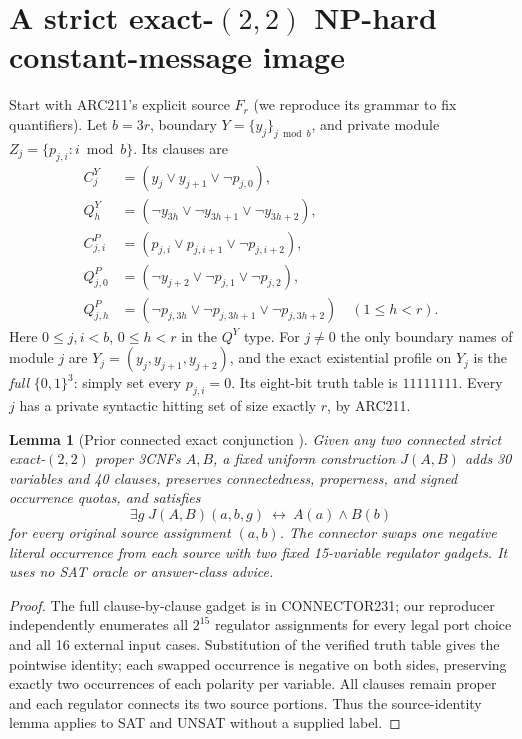 \documentclass[10pt]{article}
\newtheorem{lemma}[theorem]{Lemma}
\begin{document}
\section{A strict exact-$(2,2)$ NP-hard constant-message image}
Start with ARC211's explicit source $F_r$ (we reproduce its grammar to fix quantifiers). Let $b=3r$, boundary $Y=\{y_j\}_{j\bmod b}$, and private module $Z_j=\{p_{j,i}:i\bmod b\}$. Its clauses are
\begin{align*}
C_j^Y&=(y_j\vee y_{j+1}\vee\neg p_{j,0}),\\
Q_h^Y&=(\neg y_{3h}\vee\neg y_{3h+1}\vee\neg y_{3h+2}),\\
C_{j,i}^P&=(p_{j,i}\vee p_{j,i+1}\vee\neg p_{j,i+2}),\\
Q_{j,0}^P&=(\neg y_{j+2}\vee\neg p_{j,1}\vee\neg p_{j,2}),\\
Q_{j,h}^P&=(\neg p_{j,3h}\vee\neg p_{j,3h+1}\vee\neg p_{j,3h+2})\quad(1\le h<r).
\end{align*}
Here $0\le j,i<b$, $0\le h<r$ in the $Q^Y$ type. For $j\ne0$ the only boundary names of module $j$ are $Y_j=(y_j,y_{j+1},y_{j+2})$, and the exact existential profile on $Y_j$ is the \emph{full} $\{0,1\}^3$: simply set every $p_{j,i}=0$. Its eight-bit truth table is $11111111$. Every $j$ has a private syntactic hitting set of size exactly $r$, by ARC211.

\begin{lemma}[Prior connected exact conjunction \cite{connector231}]
Given any two connected strict exact-$(2,2)$ proper 3CNFs $A,B$, a fixed uniform construction $J(A,B)$ adds 30 variables and 40 clauses, preserves connectedness, properness, and signed occurrence quotas, and satisfies
\[
\exists g\;J(A,B)(a,b,g)\ \longleftrightarrow\ A(a)\wedge B(b)
\]
for \emph{every} original source assignment $(a,b)$. The connector swaps one negative literal occurrence from each source with two fixed 15-variable regulator gadgets. It uses no SAT oracle or answer-class advice.
\end{lemma}
\begin{proof}
The full clause-by-clause gadget is in CONNECTOR231; our reproducer independently enumerates all $2^{15}$ regulator assignments for every legal port choice and all 16 external input cases. Substitution of the verified truth table gives the pointwise identity; each swapped occurrence is negative on both sides, preserving exactly two occurrences of each polarity per variable. All clauses remain proper and each regulator connects its two source portions. Thus the source-identity lemma applies to SAT and UNSAT without a supplied label.
\end{proof}
\end{document}
